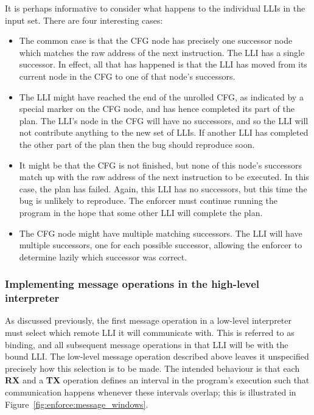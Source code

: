It is perhaps informative to consider what happens to the individual
LLIs in the input set.  There are four interesting cases:

\begin{itemize}
\item The common case is that the CFG node has precisely one successor
  node which matches the raw address of the next instruction.  The LLI
  has a single successor.  In effect, all that has happened is that
  the LLI has moved from its current node in the CFG to one of that
  node's successors.

\item The LLI might have reached the end of the unrolled CFG, as
  indicated by a special marker on the CFG node, and has hence
  completed its part of the plan.  The LLI's node in the CFG will have
  no successors, and so the LLI will not contribute anything to the
  new set of LLIs.  If another LLI has completed the other part of the
  plan then the bug should reproduce soon.

\item It might be that the CFG is not finished, but none of this
  node's successors match up with the raw address of the next
  instruction to be executed.  In this case, the plan has failed.
  Again, this LLI has no successors, but this time the bug is unlikely
  to reproduce.  The enforcer must continue running the program in the
  hope that some other LLI will complete the plan.

\item The CFG node might have multiple matching successors.  The LLI
  will have multiple successors, one for each possible successor,
  allowing the enforcer to determine lazily which successor was
  correct.
\end{itemize}

\subsubsection{Implementing message operations in the high-level interpreter}
\label{sect:enforce:hli_messages}

As discussed previously, the first message operation in a low-level
interpreter must select which remote LLI it will communicate with.
This is referred to as binding, and all subsequent message operations
in that LLI will be with the bound LLI.  The low-level message
operation described above leaves it unspecified precisely how this
selection is to be made.  The intended behaviour is that each \textbf{RX} and a
\textbf{TX} operation defines an interval in the program's execution
such that communication happens whenever these intervals overlap; this
is illustrated in Figure~\ref{fig:enforce:message_windows}.

